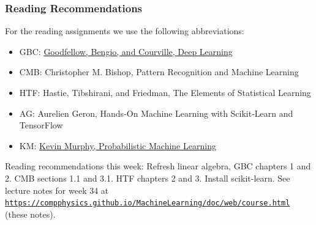 \documentclass{beamer}
\begin{document}
\begin{frame}
\frametitle{Reading Recommendations}

\begin{block}{}
For the reading assignments we use the following abbreviations:
\begin{itemize}
\item GBC: \href{{https://www.deeplearningbook.org/}}{Goodfellow, Bengio, and Courville, Deep Learning}

\item CMB: Christopher M. Bishop, Pattern Recognition and Machine Learning

\item HTF: Hastie, Tibshirani, and Friedman, The Elements of Statistical Learning

\item AG: Aurelien Geron, Hands‑On Machine Learning with Scikit‑Learn and TensorFlow

\item KM: \href{{https://probml.github.io/pml-book/book1.html}}{Kevin Murphy, Probabilistic Machine Learning}
\end{itemize}

\noindent
Reading recommendations this week: Refresh linear algebra, GBC chapters 1 and 2. CMB sections 1.1 and 3.1. HTF chapters 2 and 3. Install scikit-learn. See lecture notes for week 34 at \href{{https://compphysics.github.io/MachineLearning/doc/web/course.html}}{\nolinkurl{https://compphysics.github.io/MachineLearning/doc/web/course.html}} (these notes).
\end{block}
\end{frame}
\end{document}
